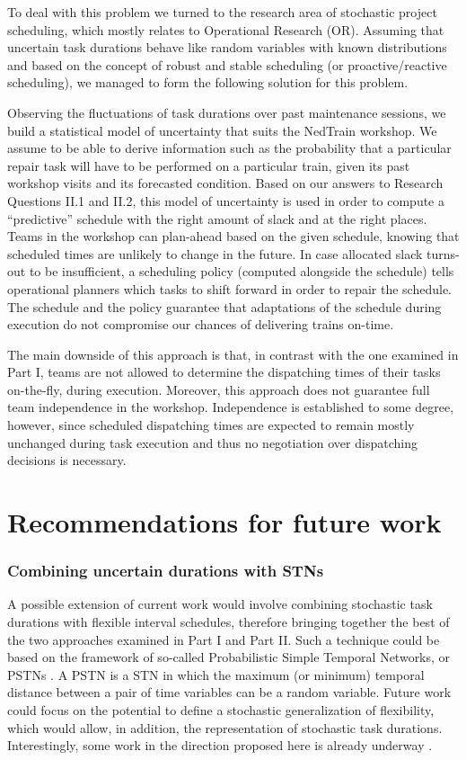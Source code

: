 	To deal with this problem we turned to the research area of stochastic project scheduling,
	which mostly relates to Operational Research (OR).
	Assuming that uncertain task durations behave like random variables with known distributions
   	and based on the concept of robust and stable scheduling (or proactive/reactive scheduling),
 	we managed to form the following solution for this problem.
 	
 	Observing the fluctuations of task durations over past maintenance sessions,
 	we build a statistical model of uncertainty that suits the NedTrain workshop.
 	We assume to be able to derive information such as the probability that a particular 
 	repair task will have to be performed on a particular train,
	given its past workshop visits and its forecasted condition.
 	Based on our answers to Research Questions II.1 and II.2,
 	this model of uncertainty is used in order to compute a ``predictive'' schedule
 	with the right amount of slack and at the right places.
 	Teams in the workshop can plan-ahead based on the given schedule,
 	knowing that scheduled times are unlikely to change in the future.
 	In case allocated slack turns-out to be insufficient,
 	a scheduling policy (computed alongside the schedule) tells operational planners which tasks to shift forward in order to repair the schedule.
 	The schedule and the policy guarantee that adaptations of the schedule during execution
 	do not compromise our chances of delivering trains on-time.
 
 	The main downside of this approach is that, in contrast with the one examined in Part I,
 	teams are not allowed to determine the dispatching times of their tasks on-the-fly, during execution.
 	Moreover, this approach does not guarantee full team independence in the workshop.
 	Independence is established to some degree, however, 
 	since scheduled dispatching times are expected to remain mostly unchanged during task execution
 	and thus no negotiation over dispatching decisions is necessary.
  	

\section{Recommendations for future work}

	\subsubsection*{Combining uncertain durations with STNs}

	A possible extension of current work would involve combining stochastic task durations 
	with flexible interval schedules, therefore bringing together the best of the two approaches examined in Part I and Part II.
	Such a technique could be based on the framework of so-called Probabilistic Simple Temporal Networks, or PSTNs \cite{santos1999}. 
	A PSTN is a STN in which the maximum (or minimum) temporal distance between a pair of time variables can be a random variable. 
	Future work could focus on the potential to define a stochastic generalization of flexibility, 
	which would allow, in addition, the representation of stochastic task durations. 
	Interestingly, some work in the direction proposed here is already underway \cite{brooks2015, lund2017}.


